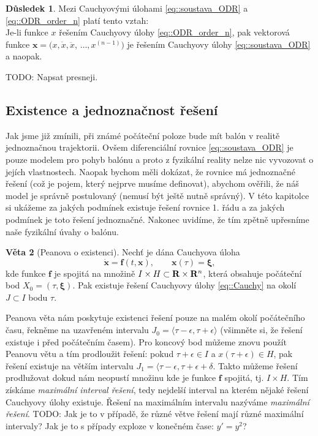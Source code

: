 \documentclass[a4paper, 12pt]{book}
\theoremstyle{definition}
\newtheorem{theorem}{Věta}[section]
\newtheorem{corollary}[theorem]{Důsledek}
\def\Real{{\rm\bf R}}
\def\vc#1{\mathbf{\boldsymbol{#1}}}     %
\def\df#1{\emph{#1}}
\def\todo#1{{\color{green}TODO:} #1}
\begin{document}
\begin{corollary}
Mezi Cauchyovými úlohami \eqref{eq::soustava_ODR} a \eqref{eq::ODR_order_n} platí tento vztah:\\
Je-li funkce $x$ řešením Cauchyovy úlohy \eqref{eq::ODR_order_n}, pak vektorová funkce
$\vc x=(x,\dot x, \ddot x$, $\dots,x^{(n-1)})$ je řešením Cauchyovy úlohy 
\eqref{eq::soustava_ODR} a naopak.
\end{corollary}
\todo{Napsat presneji.}








\subsection{Existence a jednoznačnost řešení}
Jak jsme již zmínili, při známé počáteční poloze bude mít balón v realitě jednoznačnou trajektorii. 
Ovšem diferenciální rovnice \eqref{eq::soustava_ODR} je pouze modelem pro pohyb balónu a proto 
z fyzikální reality nelze nic vyvozovat o jejích vlastnostech. Naopak bychom měli dokázat, že rovnice má 
jednoznačné řešení (což je pojem, který nejprve musíme definovat), abychom ověřili, že náš model je správně postulovaný 
(nemusí být ještě nutně správný). V této kapitolce si ukážeme za jakých podmínek existuje řešení rovnice 1. řádu a
za jakých podmínek je toto řešení jednoznačné. Nakonec uvidíme, že tím zpětně upřesníme naše fyzikální úvahy o balónu.



\begin{theorem}[Peanova o existenci]
\label{thm::Peano}
Nechť je dána Cauchyova úloha
\begin{equation}
  \label{eq::Cauchy}
  \dot{\vc x}=\vc f(t,\vc x),\qquad\vc x(\tau)=\vc \xi,
\end{equation}
kde funkce $\vc f$ je spojitá na množině $I \times H \subset \Real \times \Real^n$, která obsahuje počáteční bod $X_0=( \tau, \vc \xi)$.
Pak existuje řešení Cauchyovy úlohy \eqref{eq::Cauchy} na okolí $J \subset I$ bodu $\tau$.
\end{theorem}

Peanova věta nám poskytuje existenci řešení pouze na malém okolí počátečního času, řekněme na uzavřeném intervalu $J_0=\langle \tau-\epsilon, \tau + \epsilon \rangle$ 
(všimněte si, že řešení existuje i před počátečním časem). Pro koncový bod můžeme znovu použít Peanovu větu a tím prodloužit řešení: pokud $\tau + \epsilon \in I$
a $x(\tau + \epsilon) \in H$, pak řešení existuje na větším intervalu $J_1 = \langle \tau - \epsilon, \tau + \epsilon + \delta$. Takto můžeme řešení prodlužovat dokud nám neopustí množinu
kde je funkce $\vc f$ spojitá, tj. $I \times H$. Tím získáme \df{maximální interval řešení}, tedy nejdelší interval na kterém nějaké řešení Cauchyovy úlohy existuje. Řešení na maximálním intervalu
nazýváme \df{maximální řešení}. \todo{Jak je to v případě, že různé větve řešení mají různé maximální intervaly? Jak je to s případy exploze v konečném čase: $y'=y^2$?}
\end{document}
